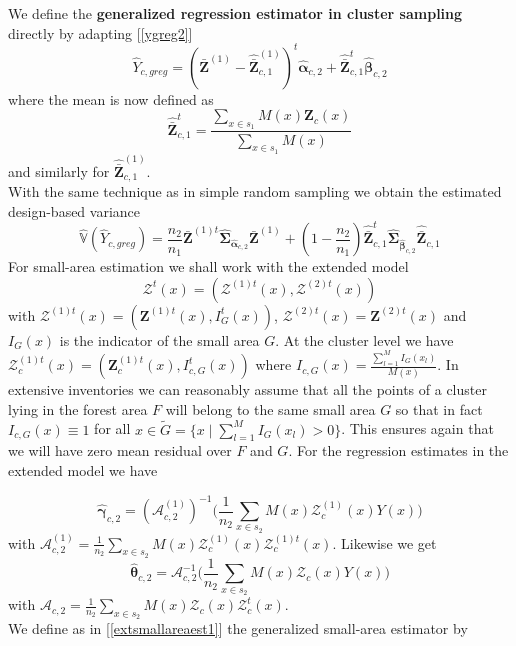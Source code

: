 \documentclass[a4paper,12pt,leqno, titlepage]{article}
\newcommand{\VAR}{\mathbb{V}}
\begin{document}
{{We define the \textbf{generalized regression estimator in cluster sampling} directly by adapting [\ref{ygreg2}]
\begin{equation}\label{ygregcluster}
\hat{Y}_{c,greg}= (\bar{\pmb{Z}}^{(1)}-\hat{\bar{\pmb{Z}}}^{(1)}_{c,1})^t\hat{\pmb{\alpha}}_{c,2} +
\hat{\bar{\pmb{Z}}}^t_{c,1}\hat{\pmb{\beta}}_{c,2}
\end{equation}
where the mean is now defined as
$$\hat{\bar{\pmb{Z}}}^t_{c,1}=\frac{\sum_{x\in{s_1}}M(x)\pmb{Z}_c(x)}{\sum_{x\in{s_1}}M(x)}$$
and similarly for $\hat{\bar{\pmb{Z}}}^{(1)}_{c,1}$.\\
With the same technique as in simple random sampling we obtain the estimated design-based variance
\begin{equation}\label{estvarclusterygereg}
\hat{\VAR}(\hat{Y}_{c,greg})=\frac{n_2}{n_1}\bar{\pmb{Z}}^{(1)t}\hat{\pmb{\Sigma}}_{\hat{\pmb{\alpha}}_{c,2}}
\bar{\pmb{Z}}^{(1)}+(1-\frac{n_2}{n_1})\hat{\bar{\pmb{Z}}}_{c,1}^t\hat{\pmb{\Sigma}}_{\hat{\pmb{\beta}}_{c,2}}
\hat{\bar{\pmb{Z}}}_{c,1}
\end{equation}
For small-area estimation we shall work with the extended model
$$\pmb{\mathcal{Z}}^t(x)=(\pmb{\mathcal{Z}}^{(1)t}(x), \pmb{\mathcal{Z}}^{(2)t}(x))$$
 with
$\pmb{\mathcal{Z}}^{(1)t}(x)=(\pmb{Z}^{(1)t}(x), I_G^t(x))$, $\pmb{\mathcal{Z}}^{(2)t}(x)=\pmb{Z}^{(2)t}(x)$ and $I_G(x)$ is the indicator of the small area $G$. At the cluster level we have $\pmb{\mathcal{Z}}_c^{(1)t}(x)=(\pmb{Z}_c^{(1)t}(x),I^t_{c,G}(x))$ where $I_{c,G}(x)=\frac{\sum_{l=1}^M I_G(x_l)}{M(x)}$. In extensive inventories we can reasonably assume that all the points of a cluster lying in the forest area $F$ will belong to the same small area $G$ so that in fact $I_{c,G}(x) \equiv 1$ for all $x\in{\tilde{G}}=\{x \mid \sum_{l=1}^M I_G(x_l)>0\}$. This ensures again that we will have zero mean residual over $F$ and $G$.  For the regression estimates in the extended model we have

\begin{equation}\label{regbettaclusterext}
\hat{\pmb{\gamma}}_{c,2}=(\pmb{\mathcal{A}}_{c,2}^{(1)})^{-1}\Big(\frac{1}{n_2}\sum_{x\in{s_2}}M(x)
\pmb{\mathcal{Z}}^{(1)}_c(x)Y(x)\Big)
\end{equation}
with $\pmb{\mathcal{A}}_{c,2}^{(1)}=\frac{1}{n_2}\sum_{x\in{s_2}}M(x)
\pmb{\mathcal{Z}}^{(1)}_c(x)\pmb{\mathcal{Z}}^{(1)t}_c(x)$. Likewise we get
\begin{equation}\label{regbettaclusterext}
\hat{\pmb{\theta}}_{c,2}=\pmb{\mathcal{A}}^{-1}_{c,2}\Big(\frac{1}{n_2}\sum_{x\in{s_2}}M(x)
\pmb{\mathcal{Z}}_c(x)Y(x)\Big)
\end{equation}
with $\pmb{\mathcal{A}}_{c,2}=\frac{1}{n_2}\sum_{x\in{s_2}}M(x)\pmb{\mathcal{Z}}_c(x)\pmb{\mathcal{Z}}^t_c(x)$.\\
We define as in [\ref{extsmallareaest1}] the generalized small-area estimator by

}}
\end{document}
